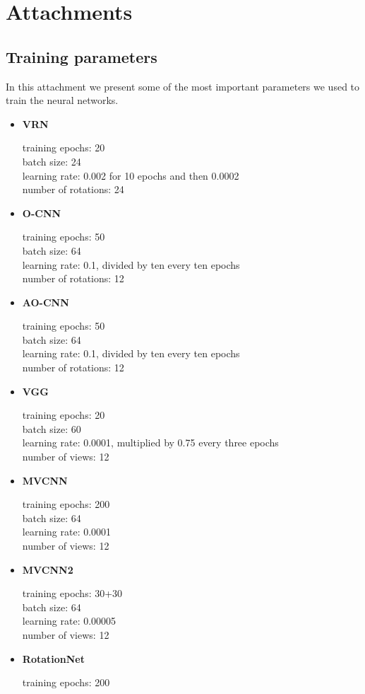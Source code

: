 \appendix
\chapter{Attachments}
\section{Training parameters}
\label{Attachment:params}
In this attachment we present some of the most important parameters we used to train the neural networks.

\def\myitem #1#2{
	\item { \textbf{#1} \par #2
	}
}

\begin{itemize}
	\myitem{VRN}{
	training epochs: 20\\
	batch size: 24\\
	learning rate: 0.002 for 10 epochs and then 0.0002\\
	number of rotations: 24\\}
\myitem{O-CNN}{
	training epochs: 50\\
	batch size: 64\\
	learning rate: 0.1, divided by ten every ten epochs\\
	number of rotations: 12\\}
\myitem{AO-CNN}{
	training epochs: 50\\
	batch size: 64\\
	learning rate: 0.1, divided by ten every ten epochs\\
	number of rotations: 12\\}
\myitem{VGG}{
	training epochs: 20\\
	batch size: 60\\
	learning rate: 0.0001, multiplied by 0.75 every three epochs\\
	number of views: 12\\}
\myitem{MVCNN}{
	training epochs: 200\\
	batch size: 64\\
	learning rate: 0.0001\\
	number of views: 12\\}
\myitem{MVCNN2}{
	training epochs: 30+30\\
	batch size: 64\\
	learning rate: 0.00005\\
	number of views: 12\\}
\myitem{RotationNet}{
	training epochs: 200\\
}
\end{itemize}
